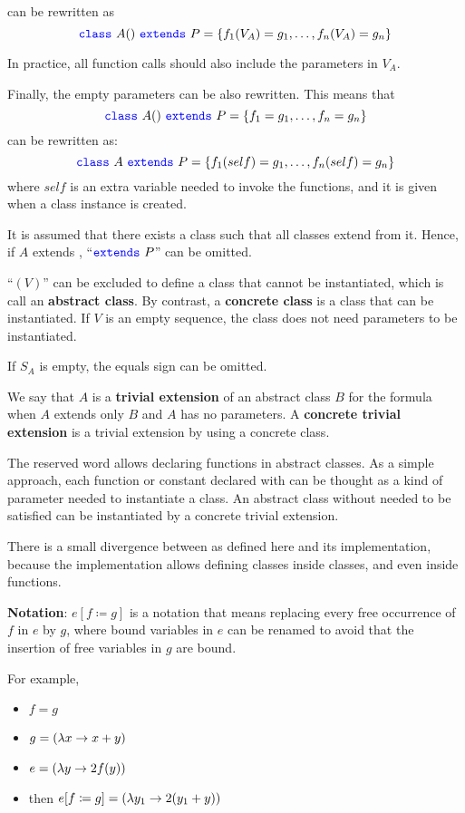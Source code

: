 can be rewritten as
\[\sclass\ A() \ \sextends\ P = \{
f_{1}(V_{A}) = g_{1},
\ldots ,
f_{n}(V_{A}) = g_{n}
\}
\]

In practice, all function calls should also include the parameters in $V_{A}$.

Finally, the empty parameters can be also rewritten.
This means that
\[{\color{blue}\texttt{{class}}}\ A() \ {\color{blue}\texttt{{extends}}}\ P = \{
f_{1} = g_{1},
\ldots ,
f_{n} = g_{n}
\}
\]
can be rewritten as:
\[{\color{blue}\texttt{{class}}}\ A \ {\color{blue}\texttt{{extends}}}\ P = \{
f_{1}(self) = g_{1},
\ldots ,
f_{n}(self) = g_{n}
\}
\]
where $self$ is an extra variable needed to invoke the functions, and it is given when a class instance is created.

It is assumed that there exists a class  such that all classes extend from it.
Hence, if $A$ extends , ``${\color{blue}\texttt{{extends}}}\ P$'' can be omitted.

``$(V)$'' can be excluded to define a class that cannot be instantiated, which is call an \textbf{abstract class}.
By contrast, a \textbf{concrete class} is a class that can be instantiated.
If $V$ is an empty sequence, the class does not need parameters to be instantiated.

If $S_{A}$ is empty, the equals sign can be omitted.

We say that $A$ is a \textbf{trivial extension} of an abstract class $B$ for the formula when $A$ extends only $B$ and $A$ has no parameters.
A \textbf{concrete trivial extension} is a trivial extension by using a concrete class.

The \shas reserved word allows declaring functions in abstract classes.
As a simple approach, each function or constant declared with \shas can be thought as a kind of parameter needed to instantiate a class.
An abstract class without \shas needed to be satisfied can be instantiated by a concrete trivial extension.

There is a small divergence between \Soda as defined here and its implementation, because the implementation allows defining classes inside classes, and even inside functions.

\textbf{Notation}: $e[f \coloneqq g]$ is a notation that means replacing every free occurrence of $f$ in $e$ by $g$, where bound variables in $e$ can be renamed to avoid that the insertion of free variables in $g$ are bound.

For example,
\begin{itemize}
    \item $f = g$
    \item $g = (\lambda {x} \to {x + y})$
    \item $e = (\lambda {y} \to {2 f(y)})$
    \item then $e[f \coloneqq g] = (\lambda {y_{1}} \to {2 (y_{1} + y)})$
\end{itemize}


